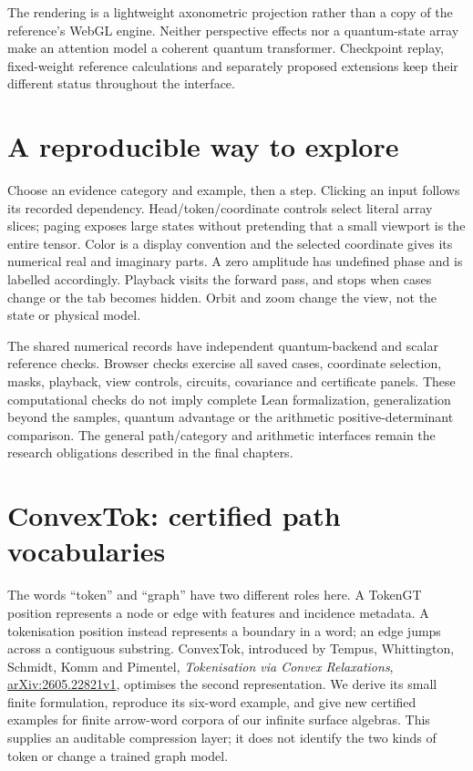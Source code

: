 \documentclass[11pt,oneside,openany]{book}
\theoremstyle{definition}\newtheorem{definition}[theorem]{Definition}
\theoremstyle{remark}\newtheorem{remark}[theorem]{Remark}
\begin{document}
The rendering is a lightweight axonometric projection rather than a copy
of the reference's WebGL engine. Neither perspective effects nor a
quantum-state array make an attention model a coherent quantum transformer.
Checkpoint replay, fixed-weight reference calculations and separately
proposed extensions keep their different status throughout the interface.

\section{A reproducible way to explore}
Choose an evidence category and example, then a step. Clicking an input
follows its recorded dependency. Head/token/coordinate controls select
literal array slices; paging exposes large states without pretending that a
small viewport is the entire tensor. Color is a display convention and the
selected coordinate gives its numerical real and imaginary parts. A zero
amplitude has undefined phase and is labelled accordingly. Playback visits
the forward pass, and stops when cases change or the tab becomes hidden.
Orbit and zoom change the view, not the state or physical model.

The shared numerical records have independent quantum-backend and scalar
reference checks. Browser checks exercise all saved cases, coordinate
selection, masks, playback, view controls, circuits, covariance and certificate
panels. These computational checks do not imply complete Lean formalization,
generalization beyond the samples, quantum advantage or the arithmetic
positive-determinant comparison. The general path/category and arithmetic
interfaces remain the research obligations described in the final chapters.

\section{ConvexTok: certified path vocabularies}
\label{convextok:section}
The words ``token'' and ``graph'' have two different roles here. A TokenGT
position represents a node or edge with features and incidence metadata.
A tokenisation position instead represents a boundary in a word; an edge
jumps across a contiguous substring. ConvexTok, introduced by Tempus,
Whittington, Schmidt, Komm and Pimentel,
\emph{Tokenisation via Convex Relaxations},
\href{https://arxiv.org/html/2605.22821v1}{arXiv:2605.22821v1},
optimises the second representation. We derive its small finite
formulation, reproduce its six-word example, and give new certified
examples for finite arrow-word corpora of our infinite surface algebras.
This supplies an auditable compression layer; it does not identify the two
kinds of token or change a trained graph model.
\end{document}
